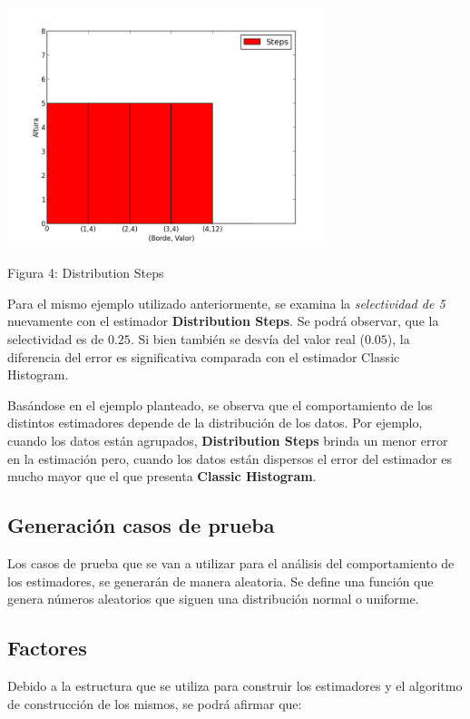 \documentclass[10pt, a4paper,english,spanish,hidelinks]{article}
\begin{document}
\centerline{  \includegraphics[width=0.7\textwidth]{./imagenes/ejb1_ejemplo_steps.png}}
  \centerline{Figura 4: Distribution Steps}



Para el mismo ejemplo utilizado anteriormente, se examina la \textit{selectividad de 5} nuevamente con el estimador \textbf{Distribution Steps}.
Se podrá observar, que la selectividad es de $0.25$. Si bien también se desvía del
valor real ($0.05$), la diferencia del error es significativa comparada con el estimador Classic Histogram.


Basándose en el ejemplo planteado, se observa que el comportamiento de los distintos estimadores
depende de la distribución de los datos.
Por ejemplo, cuando los datos están agrupados, \textbf{Distribution Steps} brinda un menor
error en la estimación pero, cuando los datos están dispersos el error del estimador es
mucho mayor que el que presenta \textbf{Classic Histogram}.


\subsection{Generación casos de prueba}
Los casos de prueba que se van a utilizar para el análisis del comportamiento de los
estimadores, se generarán de manera aleatoria. Se define una función que genera números
aleatorios que siguen una distribución normal o uniforme.

\subsection{Factores}

Debido a la estructura que se utiliza para construir los estimadores y el algoritmo de
construcción de los mismos, se podrá afirmar que:
\end{document}
